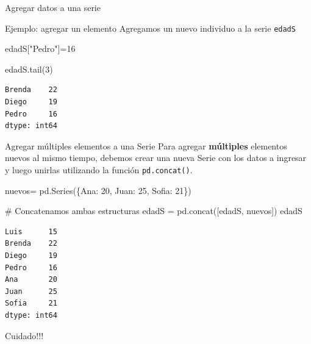 \documentclass[
  ignorenonframetext,
  aspectratio=169,
  spanish,
]{beamer}
\newenvironment{Shaded}{\begin{snugshade}}{\end{snugshade}}
\newcommand{\CommentTok}[1]{\textcolor[rgb]{0.37,0.37,0.37}{#1}}
\newcommand{\DecValTok}[1]{\textcolor[rgb]{0.68,0.00,0.00}{#1}}
\newcommand{\NormalTok}[1]{\textcolor[rgb]{0.00,0.23,0.31}{#1}}
\newcommand{\OperatorTok}[1]{\textcolor[rgb]{0.37,0.37,0.37}{#1}}
\newcommand{\StringTok}[1]{\textcolor[rgb]{0.13,0.47,0.30}{#1}}
\begin{document}
\begin{frame}[fragile]{Agregar datos a una serie}
\label{agregar-datos-a-una-serie}
\begin{block}{Ejemplo: agregar un elemento}
\label{ejemplo-agregar-un-elemento}
Agregamos un nuevo individuo a la serie \texttt{edadS}

\begin{Shaded}
\begin{Highlighting}[]
\NormalTok{edadS[}\StringTok{"Pedro"}\NormalTok{]}\OperatorTok{=}\DecValTok{16}

\NormalTok{edadS.tail(}\DecValTok{3}\NormalTok{)}
\end{Highlighting}
\end{Shaded}

\begin{verbatim}
Brenda    22
Diego     19
Pedro     16
dtype: int64
\end{verbatim}
\end{block}

\begin{block}{Agregar múltiples elementos a una Serie}
\label{agregar-muxfaltiples-elementos-a-una-serie}
Para agregar \textbf{múltiples} elementos nuevos al mismo tiempo,
debemos crear una nueva Serie con los datos a ingresar y luego unirlas
utilizando la función \texttt{pd.concat()}.

\begin{Shaded}
\begin{Highlighting}[]
\NormalTok{nuevos}\OperatorTok{=}\NormalTok{ pd.Series(\{}\StringTok{\textquotesingle{}Ana\textquotesingle{}}\NormalTok{: }\DecValTok{20}\NormalTok{, }\StringTok{\textquotesingle{}Juan\textquotesingle{}}\NormalTok{: }\DecValTok{25}\NormalTok{, }\StringTok{\textquotesingle{}Sofia\textquotesingle{}}\NormalTok{: }\DecValTok{21}\NormalTok{\})}

\CommentTok{\# Concatenamos ambas estructuras}
\NormalTok{edadS }\OperatorTok{=}\NormalTok{ pd.concat([edadS, nuevos])}
\NormalTok{edadS}
\end{Highlighting}
\end{Shaded}

\begin{verbatim}
Luis      15
Brenda    22
Diego     19
Pedro     16
Ana       20
Juan      25
Sofia     21
dtype: int64
\end{verbatim}
\end{block}

\begin{block}{Cuidado!!!}
\label{cuidado}
\begin{tcolorbox}[enhanced jigsaw, left=2mm, rightrule=.15mm, opacityback=0, title=\textcolor{quarto-callout-warning-color}{\faExclamationTriangle}\hspace{0.5em}{Advertencia}, toprule=.15mm, arc=.35mm, bottomrule=.15mm, colback=white, opacitybacktitle=0.6, leftrule=.75mm, bottomtitle=1mm, colbacktitle=quarto-callout-warning-color!10!white, toptitle=1mm, colframe=quarto-callout-warning-color-frame, titlerule=0mm, coltitle=black, breakable]


\end{tcolorbox}
\end{block}
\end{frame}
\end{document}
